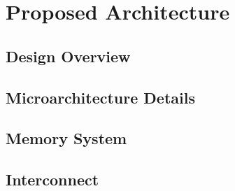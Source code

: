 \section{Proposed Architecture}

\subsection{Design Overview}

\subsection{Microarchitecture Details}

\subsection{Memory System}

\subsection{Interconnect}

